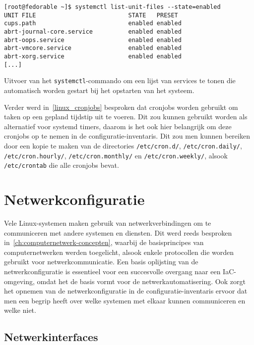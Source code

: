 \begin{listing}
  \begin{verbatim}
[root@fedorable ~]$ systemctl list-unit-files --state=enabled
UNIT FILE                          STATE   PRESET
cups.path                          enabled enabled
abrt-journal-core.service          enabled enabled
abrt-oops.service                  enabled enabled
abrt-vmcore.service                enabled enabled
abrt-xorg.service                  enabled enabled
[...]
  \end{verbatim}
  \caption{Uitvoer van het \texttt{systemctl}-commando om een lijst van services te tonen die automatisch worden gestart bij het opstarten van het systeem.}
  \label{lst:systemd_list_unit_files}
\end{listing}

Verder werd in~\ref{linux_cronjobs} besproken dat cronjobs worden gebruikt om taken op een gepland tijdstip uit te voeren.
Dit zou kunnen gebruikt worden als alternatief voor systemd timers, daarom is het ook hier belangrijk om deze cronjobs op te nemen in de configuratie-inventaris.
Dit zou men kunnen bereiken door een kopie te maken van de directories \texttt{/etc/cron.d/}, \texttt{/etc/cron.daily/}, \texttt{/etc/cron.hourly/}, \texttt{/etc/cron.monthly/} en \texttt{/etc/cron.weekly/}, alsook \texttt{/etc/crontab} die alle cronjobs bevat.

\section{Netwerkconfiguratie}
\label{risico_netwerkconfiguratie}

Vele Linux-systemen maken gebruik van netwerkverbindingen om te communiceren met andere systemen en diensten.
Dit werd reeds besproken in~\ref{ch:computernetwerk-concepten}, waarbij de basisprincipes van computernetwerken werden toegelicht, alsook enkele protocollen die worden gebruikt voor netwerkcommunicatie.
Een basis oplijsting van de netwerkconfiguratie is essentieel voor een succesvolle overgang naar een IaC-omgeving, omdat het de basis vormt voor de netwerkautomatisering.
Ook zorgt het opnemen van de netwerkconfiguratie in de configuratie-inventaris ervoor dat men een begrip heeft over welke systemen met elkaar kunnen communiceren en welke niet.

\subsection{Netwerkinterfaces}
\label{risico_netwerkinterfaces}

